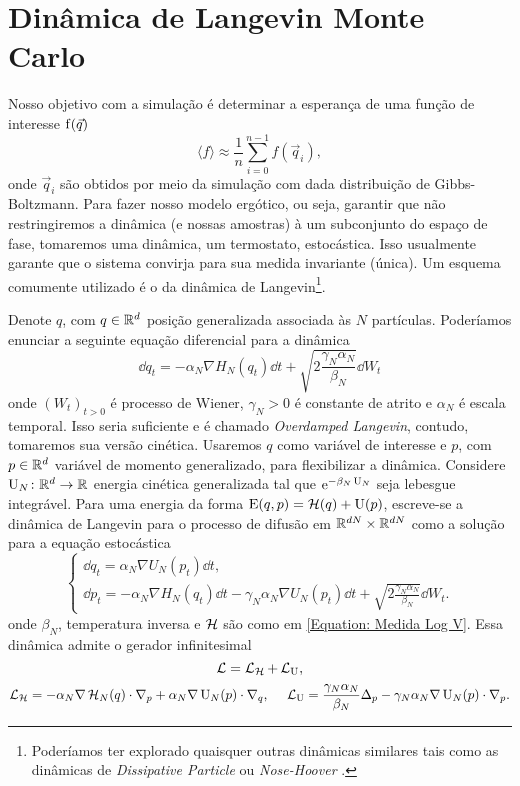 \section{Dinâmica de Langevin Monte Carlo}

Nosso objetivo com a simulação é determinar a esperança de uma função de interesse $\operatorname{f}(\vec{q})$ $$\langle f \rangle \approx \frac{1}{n} \sum_{i=0}^{n-1} f(\vec{q}_i),$$ onde $\vec{q}_i$ são obtidos por meio da simulação com dada distribuição de Gibbs-Boltzmann. Para fazer nosso modelo ergótico, ou seja, garantir que não restringiremos a dinâmica (e nossas amostras) à um subconjunto do espaço de fase, tomaremos uma dinâmica, um termostato, estocástica. Isso usualmente garante que o sistema convirja para sua medida invariante (única). Um esquema comumente utilizado é o da dinâmica de Langevin\footnote{Poderíamos ter explorado quaisquer outras dinâmicas similares tais como as dinâmicas de \textit{Dissipative Particle} \cite{DPD} ou \textit{Nose-Hoover} \cite{Hoover}.}.

Denote $q$, com $q \in \mathbb{R}^d$ posição generalizada associada às $N$ partículas. Poderíamos enunciar a seguinte equação diferencial para a dinâmica
\begin{equation}
	\dd q_t = -\alpha_N \nabla H_N(q_t) \dd t + \sqrt{2\frac{\gamma_N \alpha_N}{\beta_N}} \dd W_t
	\label{Equação: Langevin Overdamped}
\end{equation}
onde $(W_t)_{t>0}$ é processo de Wiener, $\gamma_N > 0$ é constante de atrito e $\alpha_N$ é escala temporal. Isso seria suficiente e é chamado \textit{Overdamped Langevin}, contudo, tomaremos sua versão cinética. Usaremos $q$ como variável de interesse e $p$, com $p \in \mathbb{R}^d$ variável de momento generalizado, para flexibilizar a dinâmica. Considere $\operatorname{U}_N \colon \mathbb{R}^d \rightarrow \mathbb{R}$ energia cinética generalizada tal que $\operatorname{e}^{-\beta_N \operatorname{U}_N}$ seja lebesgue integrável. Para uma energia da forma $\operatorname{E}(q,p) = \operatorname{\mathcal{H}}(q) + \operatorname{U}(p)$, escreve-se \cite{Stoltz2018} a dinâmica de Langevin para o processo de difusão em $\mathbb{R}^{dN} \times \mathbb{R}^{dN}$ como a solução para a equação estocástica 
\begin{equation}
\begin{cases}
	\dd q_t = \alpha_N \nabla U_N (p_t) \dd t, \\
	\dd p_t = -\alpha_N \nabla H_N(q_t) \dd t - \gamma_N \alpha_N \nabla U_N(p_t) \dd t + \sqrt{2\frac{\gamma_N \alpha_N}{\beta_N}} \dd W_t.
\end{cases}
\label{Equação: EqDif - Dinamica Langevin}
\end{equation}
onde $\beta_N$, temperatura inversa e $\operatorname{\mathcal{H}}$ são como em \ref{Equation: Medida Log V}. Essa dinâmica admite o gerador infinitesimal 
\[
	\operatorname{\mathcal{L}} = \operatorname{\mathcal{L}}_{\operatorname{\mathcal{H}}} + \operatorname{\mathcal{L}}_{\operatorname{U}},
\]
\[
 \operatorname{\mathcal{L}}_{\operatorname{\mathcal{H}}} = -\alpha_N \nabla\operatorname{\mathcal{H}}_N(q) \cdot \nabla_p + \alpha_N \nabla \operatorname{U}_N(p) \cdot \nabla_q, \ \ \ \ \operatorname{\mathcal{L}}_{\operatorname{U}} = \frac{\gamma_N\alpha_N}{\beta_N} \Delta_p - \gamma_N \alpha_N \nabla \operatorname{U}_N(p) \cdot \nabla_p.
\]

